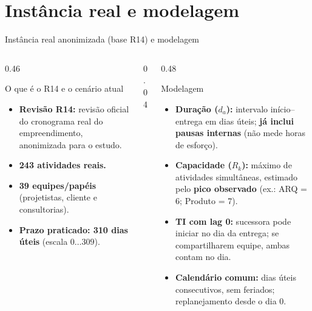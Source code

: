 \documentclass[aspectratio=169]{beamer}
\begin{document}
\section{Instância real e modelagem}

\begin{frame}{Instância real anonimizada (base R14) e modelagem}

\begin{columns}[T,onlytextwidth]

\begin{column}{0.46\textwidth}
\begin{block}{O que é o R14 e o cenário atual}
\scriptsize
\begin{itemize}
    \setlength{\itemsep}{0.10cm}
    \item \textbf{Revisão R14:} revisão oficial do cronograma real do empreendimento, anonimizada para o estudo.
    \item \textbf{243 atividades reais.}
    \item \textbf{39 equipes/papéis} (projetistas, cliente e consultorias).
    \item \textbf{Prazo praticado: 310 dias úteis} (escala $0 \dots 309$).
\end{itemize}
\end{block}
\end{column}

\begin{column}{0.04\textwidth}\end{column}

\begin{column}{0.48\textwidth}
\begin{block}{Modelagem}
\scriptsize
\begin{itemize}
    \setlength{\itemsep}{0.07cm}
    \item \textbf{Duração ($d_a$):} intervalo início--entrega em dias úteis; \textbf{já inclui pausas internas} (não mede horas de esforço).
    \item \textbf{Capacidade ($R_k$):} máximo de atividades simultâneas, estimado pelo \textbf{pico observado} (ex.: ARQ = 6; Produto = 7).
    \item \textbf{TI com lag 0:} sucessora pode iniciar no dia da entrega; se compartilharem equipe, ambas contam no dia.
    \item \textbf{Calendário comum:} dias úteis consecutivos, sem feriados; replanejamento desde o dia 0.
\end{itemize}
\end{block}
\end{column}


\end{columns}
\end{frame}
\end{document}

